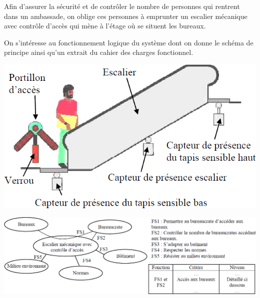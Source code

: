 \documentclass[10pt]{article}
\begin{document}
\begin{minipage}[c]{.45\linewidth}
Afin d'assurer la sécurité et de contrôler le nombre de personnes qui rentrent dans un ambassade, on oblige ces personnes à emprunter un escalier mécanique avec contrôle d'accès qui mène à l'étage où se situent les bureaux.

On s'intéresse au fonctionnement logique du système dont on donne le schéma de principe ainsi qu'un extrait du cahier des charges fonctionnel.


\end{minipage}
\hfill
\begin{minipage}[c]{.45\linewidth}
\begin{center}
\includegraphics[width=.9\textwidth]{png/fig1}
\end{center}
\end{minipage}

\begin{center}
\includegraphics[width=.9\textwidth]{png/fig2}
\end{center}
\end{document}
